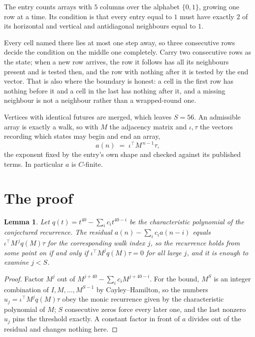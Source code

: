 \documentclass[11pt,a4paper]{article}
\theoremstyle{plain}
\newtheorem{lemma}[theorem]{Lemma}
\theoremstyle{definition}
\begin{document}
The entry counts arrays with $5$ columns over the alphabet $\{0,1\}$, growing one row at a time. Its condition is that every entry equal to $1$ must have exactly $2$ of its horizontal and vertical and antidiagonal neighbours equal to $1$.

Every cell named there lies at most one step away, so three consecutive rows decide the condition on the middle one completely. Carry two consecutive rows as the state; when a new row arrives, the row it follows has all its neighbours present and is tested then, and the row with nothing after it is tested by the end vector. That is also where the boundary is honest: a cell in the first row has nothing before it and a cell in the last has nothing after it, and a missing neighbour is not a neighbour rather than a wrapped-round one.

Vertices with identical futures are merged, which leaves $S=56$. An admissible array is exactly a walk, so with $M$ the adjacency matrix and $\iota,\tau$ the vectors recording which states may begin and end an array,
\[
a(n)\;=\;\iota^{\!\top}M^{\,n-1}\tau ,
\]
the exponent fixed by the entry's own shape and checked against its published terms. In
particular $a$ is $C$-finite.

\section{The proof}

\begin{lemma}\label{lem:crit}
Let $q(t)=t^{40}-\sum_i c_it^{40-i}$ be the characteristic polynomial of the
conjectured recurrence. The residual $a(n)-\sum_ic_ia(n-i)$ equals
$\iota^{\!\top}M^{\,j}q(M)\tau$ for the corresponding walk index $j$, so the recurrence
holds from some point on if and only if $\iota^{\!\top}M^{j}q(M)\tau=0$ for all large $j$,
and it is enough to examine $j<S$.
\end{lemma}

\begin{proof}
Factor $M^{j}$ out of $M^{j+40}-\sum_ic_iM^{j+40-i}$. For the bound, $M^{S}$
is an integer combination of $I,M,\dots,M^{S-1}$ by Cayley--Hamilton, so the numbers
$u_j=\iota^{\!\top}M^{j}q(M)\tau$ obey the monic recurrence given by the characteristic
polynomial of $M$; $S$ consecutive zeros force every later one, and the last nonzero $u_j$
pins the threshold exactly. A constant factor in front of $a$ divides out of the residual and
changes nothing here.
\end{proof}
\end{document}
